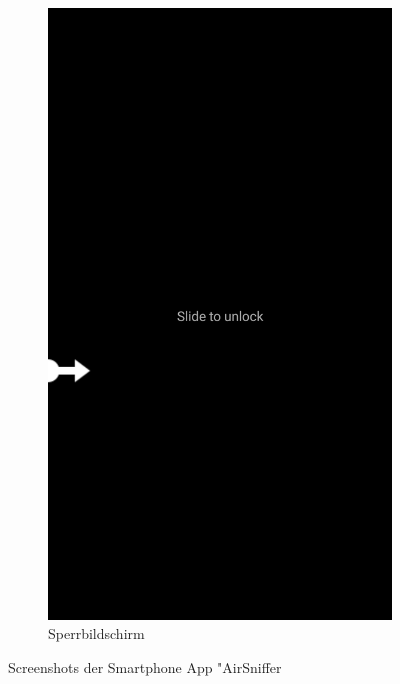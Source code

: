 \documentclass[11pt,a4paper]{article}
\begin{document}
\begin{figure}[htbp]
\begin{subfigure}[htbp]{0.26\textwidth}
        \includegraphics[width=\textwidth]{pics/screenshots/AirSniffer_Lockscreen.png}
        \caption{Sperrbildschirm}
        \label{fig:AirSniffer_Lockscreen}
    \end{subfigure}

    \caption{Screenshots der Smartphone App "AirSniffer}
    \label{fig:ScreenShots_AirSniffer}
\end{figure}
\end{document}
